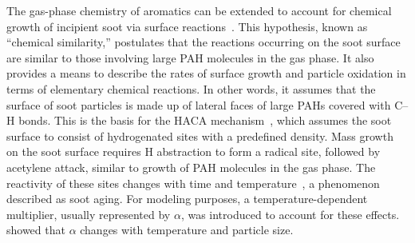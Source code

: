 The gas-phase chemistry of aromatics can be extended to account for chemical growth of incipient soot via surface reactions~\citep{frenklach2002reaction}. This hypothesis, known as “chemical similarity,” postulates that the reactions occurring on the soot surface are similar to those involving large PAH molecules in the gas phase. It also provides a means to describe the rates of surface growth and particle oxidation in terms of elementary chemical reactions. In other words, it assumes that the surface of soot particles is made up of lateral faces of large PAHs covered with C–H bonds. This is the basis for the HACA mechanism~\citep{frenklach1991detailed, appel2000kinetic}, which assumes the soot surface to consist of hydrogenated sites with a predefined density. Mass growth on the soot surface requires H abstraction to form a radical site, followed by acetylene attack, similar to growth of PAH molecules in the gas phase. The reactivity of these sites changes with time and temperature~\citep{woods1991soot, dasch1985decay}, a phenomenon described as soot aging. For modeling purposes, a temperature-dependent multiplier, usually represented by $\alpha$, was introduced to account for these effects. \citet{appel2000kinetic} showed that $\alpha$ changes with temperature and particle size.


